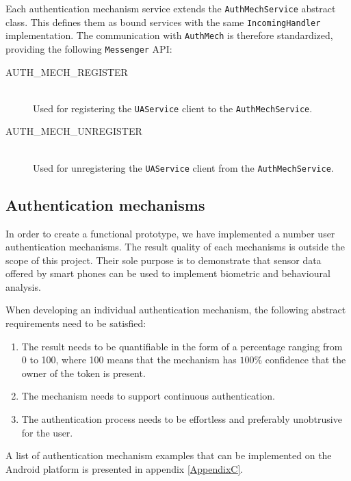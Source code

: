 Each authentication mechanism service extends the {\tt AuthMechService} abstract class. This defines them as bound services with the same {\tt IncomingHandler} implementation. The communication with {\tt AuthMech} is therefore standardized, providing the following {\tt Messenger} API:
\begin{description}
  \item[AUTH\_MECH\_REGISTER] \hfill \\
  Used for registering the {\tt UAService} client to the {\tt AuthMechService}.
  
  \item[AUTH\_MECH\_UNREGISTER] \hfill \\
  Used for unregistering the {\tt UAService} client from the {\tt AuthMechService}.
\end{description}    

  
\subsection{Authentication mechanisms}
\label{implauthmech}
In order to create a functional prototype, we have implemented a number user authentication mechanisms. The result quality of each mechanisms is outside the scope of this project. Their sole purpose is to demonstrate that sensor data offered by smart phones can be used to implement biometric and behavioural analysis.

When developing an individual authentication mechanism, the following abstract requirements need to be satisfied: 
\begin{enumerate}
	\item The result needs to be quantifiable in the form of a percentage ranging from 0 to 100, where 100 means that the mechanism has $100\%$ confidence that the owner of the token is present.
	\item The mechanism needs to support continuous authentication.
	\item The authentication process needs to be effortless and preferably unobtrusive for the user.
\end{enumerate}
A list of authentication mechanism examples that can be implemented on the Android platform is presented in appendix \ref{AppendixC}.

